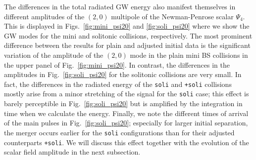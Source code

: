 \documentclass[11pt]{report}  %
\begin{document}
The differences in the total radiated GW energy also manifest themselves
in different amplitudes of the $(2,0)$ multipole of the Newman-Penrose
scalar $\Psi_4$. This is displayed in Figs.~\ref{fig:mini_psi20}
and \ref{fig:soli_psi20} where we show the GW modes for the mini and
solitonic collisions, respectively. The most prominent difference
between the results for plain and adjusted initial data is the
significant variation of the amplitude of the $(2,0)$ mode in the
plain mini BS collisions in the upper panel of Fig.~\ref{fig:mini_psi20}.
In contrast, the differences in the amplitudes in Fig.~\ref{fig:soli_psi20}
for the solitonic collisions are very small. In fact, the differences
in the radiated energy of the {\tt soli} and {\tt +soli} collisions mostly
arise from a minor stretching of the signal for the {\tt soli} case; this
effect is barely perceptible in Fig.~\ref{fig:soli_psi20} but is amplified
by the integration in time when we calculate the energy. Finally, we note
the different times of arrival of the main pulses in Fig.~\ref{fig:soli_psi20};
especially for larger initial separation, the merger occurs earlier for
the {\tt soli} configurations than for their adjusted counterparts
{\tt +soli}.
We will discuss this effect together with the evolution
of the scalar field amplitude in the next subsection.
\end{document}
